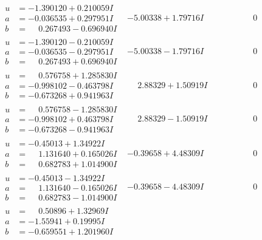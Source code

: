 \documentclass[1p]{elsarticle_modified}
\theoremstyle{definition}
\begin{document}
$$\begin{array}{c|c|c}
\begin{aligned}
u &= -1.390120 + 0.210059 I \\
a &= -0.036535 + 0.297951 I \\
b &= \phantom{-}0.267493 - 0.696940 I\end{aligned}
 & -5.00338 + 1.79716 I & \phantom{-0.000000 } 0 \\ \hline\begin{aligned}
u &= -1.390120 - 0.210059 I \\
a &= -0.036535 - 0.297951 I \\
b &= \phantom{-}0.267493 + 0.696940 I\end{aligned}
 & -5.00338 - 1.79716 I & \phantom{-0.000000 } 0 \\ \hline\begin{aligned}
u &= \phantom{-}0.576758 + 1.285830 I \\
a &= -0.998102 - 0.463798 I \\
b &= -0.673268 + 0.941963 I\end{aligned}
 & \phantom{-}2.88329 + 1.50919 I & \phantom{-0.000000 } 0 \\ \hline\begin{aligned}
u &= \phantom{-}0.576758 - 1.285830 I \\
a &= -0.998102 + 0.463798 I \\
b &= -0.673268 - 0.941963 I\end{aligned}
 & \phantom{-}2.88329 - 1.50919 I & \phantom{-0.000000 } 0 \\ \hline\begin{aligned}
u &= -0.45013 + 1.34922 I \\
a &= \phantom{-}1.131640 + 0.165026 I \\
b &= \phantom{-}0.682783 + 1.014900 I\end{aligned}
 & -0.39658 + 4.48309 I & \phantom{-0.000000 } 0 \\ \hline\begin{aligned}
u &= -0.45013 - 1.34922 I \\
a &= \phantom{-}1.131640 - 0.165026 I \\
b &= \phantom{-}0.682783 - 1.014900 I\end{aligned}
 & -0.39658 - 4.48309 I & \phantom{-0.000000 } 0 \\ \hline\begin{aligned}
u &= \phantom{-}0.50896 + 1.32969 I \\
a &= -1.55941 + 0.19995 I \\
b &= -0.659551 + 1.201960 I\end{aligned}

\end{array}$$
\end{document}
